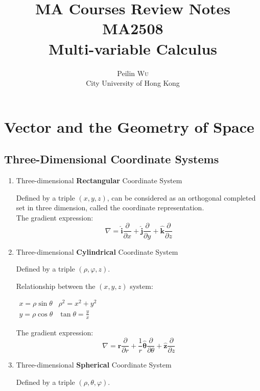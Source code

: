 \documentclass[UTF8,a4paper, 10pt, openany]{svmono}
\title{MA Courses Review Notes\\MA2508\\Multi-variable Calculus}
\author{Peilin \textsc{Wu}\\ City University of Hong Kong
}
\begin{document}
\maketitle
\tableofcontents

\chapter{Vector and the Geometry of Space}
\section{Three-Dimensional Coordinate Systems}
\begin{enumerate}
\item Three-dimensional \textbf{Rectangular} Coordinate System

Defined by a triple $(x, y, z)$, can be considered as an orthogonal completed set in three dimension, called the coordinate representation. \\

The gradient expression:
\begin{equation}
 \boxed{\nabla = \mathbf{\hat{i}}\frac{\partial }{\partial x}+\mathbf{\hat{j}}\frac{\partial }{\partial y}+\mathbf{\hat{k}}\frac{\partial }{\partial z}}
\end{equation}

\item Three-dimensional \textbf{Cylindrical} Coordinate System

Defined by a triple $(\rho, \varphi, z)$.

Relationship between the $(x, y, z)$ system:
\begin{center}
$\begin{array}{cc}
x = \rho \sin \theta  &  \rho ^2 = x^2+y^2\\
y = \rho \cos \theta  &  \tan \theta = \frac{y}{x}
\end{array}$
\end{center}

The gradient expression:
\begin{equation}
 \boxed{\nabla = \mathbf{\hat{r}}\frac{\partial }{\partial r}+\frac{1}{r}\mathbf{\hat{\theta}}\frac{\partial }{\partial \theta}+\mathbf{\hat{z}}\frac{\partial }{\partial z}}
\end{equation}

\item Three-dimensional \textbf{Spherical} Coordinate System

Defined by a triple $(\rho, \theta, \varphi)$.


\end{enumerate}
\end{document}
